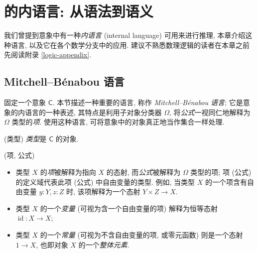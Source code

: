 \chapter{\topos{}的内语言: 从语法到语义}


我们曾提到意象中有一种\emph{内语言} (internal language) 可用来进行推理, 本章介绍这种语言, 以及它在各个数学分支中的应用.
建议不熟悉数理逻辑的读者在本章之前先阅读附录 \ref{logic-appendix}.

\section{Mitchell--B\'enabou 语言}

固定一个意象 $\mathsf C$. 本节描述一种重要的语言, 称作 \emph{Mitchell--B\'enabou 语言}; 它是意象的内语言的一种表述, 其特点是利用子对象分类器 $\Omega$, 将\emph{公式}一视同仁地解释为 $\Omega$ 类型的\emph{项}. 使用这种语言, 可将意象中的对象真正地当作集合一样处理.

\begin{definition}
    {(类型)}
    \emph{类型}是 $\mathsf C$ 的对象.
\end{definition}

\begin{definition}
    {(项, 公式)}
    \begin{itemize}
    	\item 类型 $X$ 的\emph{项}被解释为指向 $X$ 的态射, 而\emph{公式}被解释为 $\Omega$ 类型的项;
    	项 (公式) 的定义域代表此项 (公式) 中自由变量的类型.
    	例如, 当类型 $X$ 的一个项含有自由变量 $y\colon Y, z\colon Z$ 时, 该项解释为一个态射 $Y\times Z \to X$.
    	\item 类型 $X$ 的一个\emph{变量} (可视为含一个自由变量的项) 解释为恒等态射 $\operatorname{id}\colon X \to X$;
    	\item 类型 $X$ 的一个\emph{常量} (可视为不含自由变量的项, 或零元函数) 则是一个态射 $1 \to X$, 也即对象 $X$ 的一个\emph{整体元素}.
    \end{itemize}
\end{definition}

